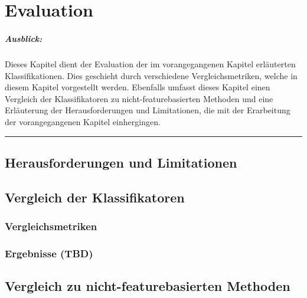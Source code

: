 
\chapter{Evaluation}

\paragraph{Ausblick:}
Dieses Kapitel dient der Evaluation der im vorangegangenen Kapitel erläuterten Klassifikationen. Dies geschieht durch verschiedene Vergleichsmetriken, welche in diesem Kapitel vorgestellt werden. Ebenfalls umfasst dieses Kapitel einen Vergleich der Klassifikatoren zu nicht-featurebasierten Methoden und eine Erläuterung der Herausforderungen und Limitationen, die mit der Erarbeitung der vorangegangenen Kapitel einhergingen.
\\
\hrule

\section{Herausforderungen und Limitationen}

\section{Vergleich der Klassifikatoren}

\subsection{Vergleichsmetriken}

\subsection{Ergebnisse (TBD)}

\section{Vergleich zu nicht-featurebasierten Methoden}

\cleardoublepage
